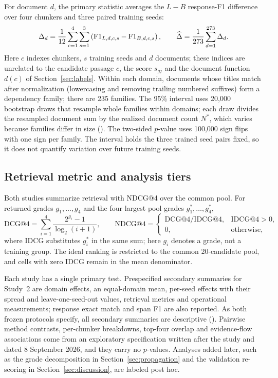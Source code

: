 For document $d$, the primary statistic averages the $L-B$ response-F1 difference over four chunkers and three paired training seeds:
\begin{equation}
 \Delta_d=\frac{1}{12}\sum_{c=1}^4\sum_{s=1}^3\left(\mathrm{F1}_{L,d,c,s}-\mathrm{F1}_{B,d,c,s}\right),\qquad
 \widehat\Delta=\frac{1}{273}\sum_{d=1}^{273}\Delta_d.
\end{equation}
Here $c$ indexes chunkers, $s$ training seeds and $d$ documents; these indices are unrelated to the candidate passage $c$, the score $s_{gj}$ and the document function $d(c)$ of Section~\ref{sec:labels}. Within each domain, documents whose titles match after normalization (lowercasing and removing trailing numbered suffixes) form a dependency family; there are 235 families. The 95\% interval uses 20,000 bootstrap draws that resample whole families within domains; each draw divides the resampled document sum by the realized document count $N^*$, which varies because families differ in size (). The two-sided $p$-value uses 100,000 sign flips with one sign per family. The interval holds the three trained seed pairs fixed, so it does not quantify variation over future training seeds.

\subsection{Retrieval metric and analysis tiers}\label{sec:metrics}
Both studies summarize retrieval with NDCG@4 over the common pool. For returned grades $g_1,\ldots,g_4$ and the four largest pool grades $g^*_1,\ldots,g^*_4$,
\begin{equation}
\mathrm{DCG}@4=\sum_{i=1}^4\frac{2^{g_i}-1}{\log_2(i+1)},\qquad
\mathrm{NDCG}@4=\begin{cases}\mathrm{DCG}@4/\mathrm{IDCG}@4,&\mathrm{IDCG}@4>0,\\0,&\mathrm{otherwise},\end{cases}
\end{equation}
where IDCG substitutes $g_i^*$ in the same sum; here $g_i$ denotes a grade, not a training group. The ideal ranking is restricted to the common 20-candidate pool, and cells with zero IDCG remain in the mean denominator.

Each study has a single primary test. Prespecified secondary summaries for Study~2 are domain effects, an equal-domain mean, per-seed effects with their spread and leave-one-seed-out values, retrieval metrics and operational measurements; response exact match and span F1 are also reported. As both frozen protocols specify, all secondary summaries are descriptive (). Pairwise method contrasts, per-chunker breakdowns, top-four overlap and evidence-flow associations come from an exploratory specification written after the study and dated 8 September 2026, and they carry no $p$-values. Analyses added later, such as the grade decomposition in Section~\ref{sec:propagation} and the validation re-scoring in Section~\ref{sec:discussion}, are labeled post hoc.


